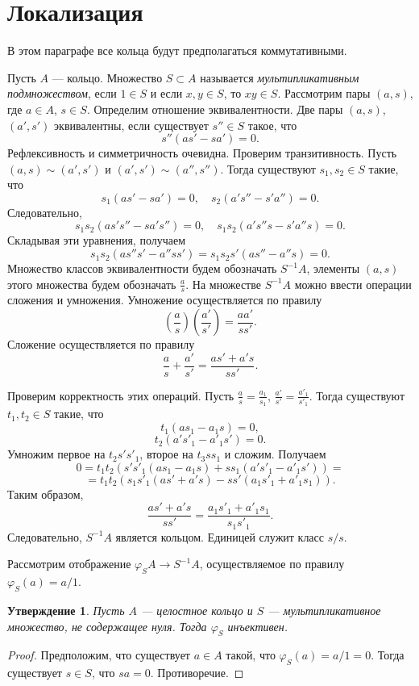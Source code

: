 \documentclass[12pt, titlepage, oneside]{amsbook}
\newtheorem{claim}[theorem]{Утверждение}
\theoremstyle{definition}
\theoremstyle{remark}
\begin{document}
\section{Локализация}

В этом параграфе все кольца будут предполагаться коммутативными.

Пусть $A$ --- кольцо. Множество $S\subset A$ называется \emph{мультипликативным подмножеством}, если $1\in S$ и если $x,y\in S$, то $xy\in S$. Рассмотрим пары $(a,s)$, где $a\in A$, $s\in S$. Определим отношение эквивалентности. Две пары $(a,s)$, $(a',s')$ эквивалентны, если существует $s''\in S$ такое, что $$s''(as'-sa')=0.$$ Рефлексивность и симметричность очевидна. Проверим транзитивность. Пусть $(a,s)\sim(a',s')$ и $(a',s')\sim(a'',s'')$. Тогда существуют $s_1,s_2\in S$ такие, что $$s_1(as'-sa')=0,\quad s_2(a's''-s'a'')=0.$$ Следовательно, $$s_1s_2(as's''-sa's'')=0,\quad s_1s_2(a's''s-s'a''s)=0.$$ Складывая эти уравнения, получаем $$s_1s_2(as''s'-a''ss')=s_1s_2s'(as''-a''s)=0.$$ Множество классов эквивалентности будем обозначать $S^{-1}A$, элементы $(a,s)$ этого множества будем обозначать $\frac{a}{s}$. На множестве $S^{-1}A$ можно ввести операции сложения и умножения. Умножение осуществляется по правилу $$(\frac{a}{s})(\frac{a'}{s'})=\frac{aa'}{ss'}.$$ Сложение осуществляется по правилу $$\frac{a}{s}+\frac{a'}{s'}=\frac{as'+a's}{ss'}.$$

Проверим корректность этих операций. Пусть $\frac{a}{s}=\frac{a_1}{s_1}$, $\frac{a'}{s'}=\frac{a'_1}{s'_1}$. Тогда существуют $t_1,t_2\in S$ такие, что $$t_1(as_1-a_1s)=0,$$ $$t_2(a's'_1-a'_1s')=0.$$ Умножим первое на $t_2s's'_1$, второе на $t_3ss_1$ и сложим. Получаем $$0=t_1t_2(s's'_1(as_1-a_1s)+ss_1(a's'_1-a'_1s'))= $$ $$=t_1t_2(s_1s'_1(as'+a's)-ss'(a_1s'_1+a'_1s_1)).$$ Таким образом, $$\frac{as'+a's}{ss'}=\frac{a_1s'_1+a'_1s_1}{s_1s'_1}.$$ Следовательно, $S^{-1}A$ является кольцом. Единицей служит класс $s/s$.

Рассмотрим отображение $\varphi_S A\rightarrow S^{-1}A$, осуществляемое по правилу $\varphi_S(a)=a/1$.

\begin{claim}
	\label{Lok1} Пусть $A$ --- целостное кольцо и $S$ --- мультипликативное множество, не содержащее нуля. Тогда $\varphi_S$ инъективен.
\end{claim}

\begin{proof}
	Предположим, что существует $a\in A$ такой, что $\varphi_S(a)=a/1=0$. Тогда существует $s\in S$, что $sa=0$. Противоречие.
\end{proof}
\end{document}
